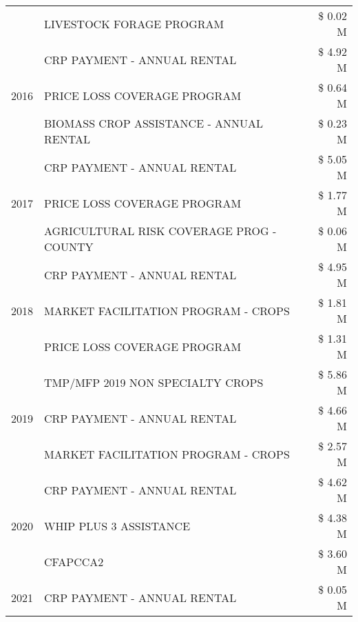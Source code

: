 \begin{tabular}{llr}
 & LIVESTOCK FORAGE PROGRAM & \$ 0.02 M \\
\cline{1-3}
\multirow[t]{3}{*}{2016} & CRP PAYMENT - ANNUAL RENTAL & \$ 4.92 M \\
 & PRICE LOSS COVERAGE PROGRAM & \$ 0.64 M \\
 & BIOMASS CROP ASSISTANCE - ANNUAL RENTAL & \$ 0.23 M \\
\cline{1-3}
\multirow[t]{3}{*}{2017} & CRP PAYMENT - ANNUAL RENTAL & \$ 5.05 M \\
 & PRICE LOSS COVERAGE PROGRAM & \$ 1.77 M \\
 & AGRICULTURAL RISK COVERAGE PROG - COUNTY & \$ 0.06 M \\
\cline{1-3}
\multirow[t]{3}{*}{2018} & CRP PAYMENT - ANNUAL RENTAL & \$ 4.95 M \\
 & MARKET FACILITATION PROGRAM - CROPS & \$ 1.81 M \\
 & PRICE LOSS COVERAGE PROGRAM & \$ 1.31 M \\
\cline{1-3}
\multirow[t]{3}{*}{2019} & TMP/MFP 2019 NON SPECIALTY CROPS & \$ 5.86 M \\
 & CRP PAYMENT - ANNUAL RENTAL & \$ 4.66 M \\
 & MARKET FACILITATION PROGRAM - CROPS & \$ 2.57 M \\
\cline{1-3}
\multirow[t]{3}{*}{2020} & CRP PAYMENT - ANNUAL RENTAL & \$ 4.62 M \\
 & WHIP PLUS 3 ASSISTANCE & \$ 4.38 M \\
 & CFAPCCA2 & \$ 3.60 M \\
\cline{1-3}
2021 & CRP PAYMENT - ANNUAL RENTAL & \$ 0.05 M \\
\cline{1-3}
\bottomrule
\end{tabular}
